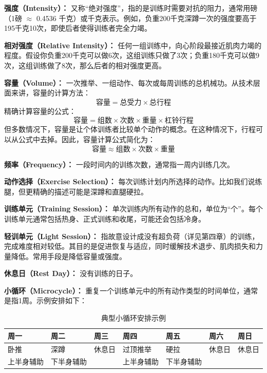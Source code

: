\documentclass[fontset=fandol, a4paper, 12pt, openright]{ctexbook}
\begin{document}
\textbf{强度（Intensity）：} 
又称“绝对强度”，指的是训练时需要对抗的阻力，通常用磅（1磅 $\approx$ 0.4536 千克）或千克表示。例如，负重200千克深蹲一次的强度要高于195千克10次，即使后者使得训练者完全力竭。

\textbf{相对强度（Relative Intensity）：} 
任何一组训练中，向心阶段最接近肌肉力竭的程度。假设你负重200千克可以做6次，这组训练只做了3次；负重180千克可以做9次，这组训练做了8次，那么后者的相对强度更高。

\textbf{容量（Volume）：} 
一次推举、一组动作、每次或每周训练的总机械功。从技术层面来讲，容量的计算方法：
\begin{equation*}
    \text{容量} = \text{总受力} \times \text{总行程}
\end{equation*}
精确计算容量的公式：
\begin{equation*}
    \text{容量} = \text{组数} \times \text{次数} \times \text{重量} \times \text{杠铃行程}
\end{equation*}
但多数情况下，容量是让个体训练者比较单个动作的概念。在这种情况下，行程可以从公式中去掉。因此，容量计算公式简化为：
\begin{equation*}
    \text{容量} \approx \text{组数} \times \text{次数} \times \text{重量}
\end{equation*}

\textbf{频率（Frequency）：} 
一段时间内的训练次数，通常指一周内训练几次。

\textbf{动作选择（Exercise Selection）：} 
每次训练计划内所选择的动作。比如我们说练腿，但更精确的描述可能是深蹲和直腿硬拉。

\textbf{训练单元（Training Session）：} 
单次训练内所有动作的总和，单位为“个”。每个训练单元通常包括热身、正式训练和收尾，可能还会包括冷身。

\textbf{轻训单元（Light Session）：} 
指故意设计成没有超负荷（详见第四章）的训练，完成难度相对较低。其目的是促进恢复与适应，同时缓解技术退步、肌肉损失和力量降低。常用手段是降低容量或强度。

\textbf{休息日（Rest Day）：} 
没有训练的日子。

\textbf{小循环（Microcycle）：} 
重复一个训练单元中的所有动作类型的时间单位，通常是指1周。示例安排如下：

\begin{table}[h]
\centering
\caption{典型小循环安排示例}
\begin{tabularx}{\textwidth}{XXXXXXX}
\toprule
周一 & 周二 & 周三 & 周四 & 周五 & 周六 & 周日 \\
\midrule
卧推 & 深蹲 & 休息日 & 过顶推举 & 硬拉 & 休息日 & 休息日 \\
\small{上半身辅助} & \small{下半身辅助} & & \small{上半身辅助} & \small{下半身辅助} & & \\
\bottomrule
\end{tabularx}
\end{table}
\end{document}
